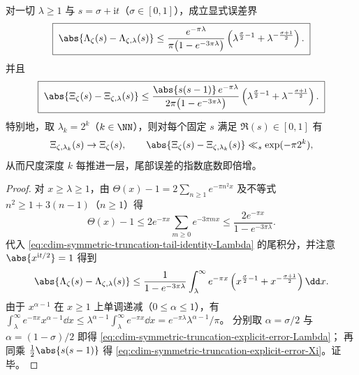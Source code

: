 \begin{theorem}[临界带内的显式误差界与尺度深度的指数收敛]\label{thm:cdim-symmetric-truncation-explicit-error}
对一切 \(\lambda\ge 1\) 与 \(s=\sigma+\mathrm{i}t\)（\(\sigma\in[0,1]\)），成立显式误差界
\begin{equation}\label{eq:cdim-symmetric-truncation-explicit-error-Lambda}
\boxed{\;
\abs{\Lambda_\zeta(s)-\Lambda_{\zeta,\lambda}(s)}
\le
\frac{e^{-\pi\lambda}}{\pi\bigl(1-e^{-3\pi\lambda}\bigr)}
\left(\lambda^{\frac{\sigma}{2}-1}+\lambda^{-\frac{\sigma+1}{2}}\right).\;}
\end{equation}
并且
\begin{equation}\label{eq:cdim-symmetric-truncation-explicit-error-Xi}
\boxed{\;
\abs{\Xi_\zeta(s)-\Xi_{\zeta,\lambda}(s)}
\le
\frac{\abs{s(s-1)}\,e^{-\pi\lambda}}{2\pi\bigl(1-e^{-3\pi\lambda}\bigr)}
\left(\lambda^{\frac{\sigma}{2}-1}+\lambda^{-\frac{\sigma+1}{2}}\right).\;}
\end{equation}
特别地，取 \(\lambda_k=2^k\)（\(k\in\NN\)），则对每个固定 \(s\) 满足 \(\Re(s)\in[0,1]\) 有
\[
\Xi_{\zeta,\lambda_k}(s)\to \Xi_\zeta(s),
\qquad
\abs{\Xi_\zeta(s)-\Xi_{\zeta,\lambda_k}(s)}\ll_s \exp(-\pi 2^k),
\]
从而尺度深度 \(k\) 每推进一层，尾部误差的指数底数即倍增。
\end{theorem}
\begin{proof}
对 \(x\ge \lambda\ge 1\)，由
\(
\Theta(x)-1=2\sum_{n\ge 1}e^{-\pi n^2x}
\)
及不等式 \(n^2\ge 1+3(n-1)\)（\(n\ge 1\)）得
\[
\Theta(x)-1\le 2e^{-\pi x}\sum_{m\ge 0}e^{-3\pi mx}
\le \frac{2e^{-\pi x}}{1-e^{-3\pi\lambda}}.
\]
代入 \eqref{eq:cdim-symmetric-truncation-tail-identity-Lambda} 的尾积分，并注意
\(
\abs{x^{\mathrm{i}t/2}}=1
\)
得到
\[
\abs{\Lambda_\zeta(s)-\Lambda_{\zeta,\lambda}(s)}
\le \frac{1}{1-e^{-3\pi\lambda}}
\int_\lambda^\infty e^{-\pi x}
\left(x^{\frac{\sigma}{2}-1}+x^{-\frac{\sigma+1}{2}}\right)\dd x.
\]
由于 \(x^{\alpha-1}\) 在 \(x\ge 1\) 上单调递减（\(0\le\alpha\le 1\)），有
\(
\int_\lambda^\infty e^{-\pi x}x^{\alpha-1}\dd x
\le \lambda^{\alpha-1}\int_\lambda^\infty e^{-\pi x}\dd x
=e^{-\pi\lambda}\lambda^{\alpha-1}/\pi
\)。
分别取 \(\alpha=\sigma/2\) 与 \(\alpha=(1-\sigma)/2\) 即得 \eqref{eq:cdim-symmetric-truncation-explicit-error-Lambda}；
再同乘 \(\tfrac12\abs{s(s-1)}\) 得 \eqref{eq:cdim-symmetric-truncation-explicit-error-Xi}。证毕。
\end{proof}

